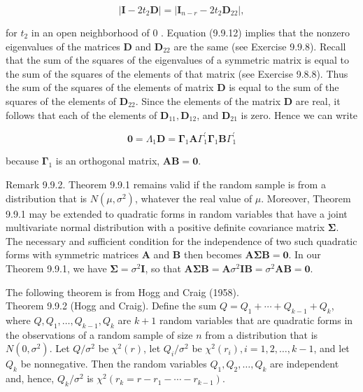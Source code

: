 \begin{equation*}
\left|\mathbf{I}-2 t_{2} \mathbf{D}\right|=\left|\mathbf{I}_{n-r}-2 t_{2} \mathbf{D}_{22}\right|, \tag{9.9.12}
\end{equation*}


for $t_{2}$ in an open neighborhood of 0 . Equation (9.9.12) implies that the nonzero eigenvalues of the matrices $\mathbf{D}$ and $\mathbf{D}_{22}$ are the same (see Exercise 9.9.8). Recall that the sum of the squares of the eigenvalues of a symmetric matrix is equal to the sum of the squares of the elements of that matrix (see Exercise 9.8.8). Thus the sum of the squares of the elements of matrix $\mathbf{D}$ is equal to the sum of the squares of the elements of $\mathbf{D}_{22}$. Since the elements of the matrix $\mathbf{D}$ are real, it follows that each of the elements of $\mathbf{D}_{11}, \mathbf{D}_{12}$, and $\mathbf{D}_{21}$ is zero. Hence we can write

$$
\mathbf{0}=\Lambda_{1} \mathbf{D}=\boldsymbol{\Gamma}_{1} \mathbf{A} \Gamma_{1}^{\prime} \boldsymbol{\Gamma}_{1} \mathbf{B} \Gamma_{1}^{\prime}
$$

because $\boldsymbol{\Gamma}_{1}$ is an orthogonal matrix, $\mathbf{A B}=\mathbf{0}$.

Remark 9.9.2. Theorem 9.9.1 remains valid if the random sample is from a distribution that is $N\left(\mu, \sigma^{2}\right)$, whatever the real value of $\mu$. Moreover, Theorem 9.9.1 may be extended to quadratic forms in random variables that have a joint multivariate normal distribution with a positive definite covariance matrix $\boldsymbol{\Sigma}$. The necessary and sufficient condition for the independence of two such quadratic forms with symmetric matrices $\boldsymbol{A}$ and $\boldsymbol{B}$ then becomes $\boldsymbol{A} \boldsymbol{\Sigma} \boldsymbol{B}=\mathbf{0}$. In our Theorem 9.9.1, we have $\boldsymbol{\Sigma}=\sigma^{2} \boldsymbol{I}$, so that $\boldsymbol{A} \boldsymbol{\Sigma} \boldsymbol{B}=\boldsymbol{A} \sigma^{2} \boldsymbol{I} \boldsymbol{B}=\sigma^{2} \boldsymbol{A} \boldsymbol{B}=\mathbf{0}$.

The following theorem is from Hogg and Craig (1958).\\
Theorem 9.9.2 (Hogg and Craig). Define the sum $Q=Q_{1}+\cdots+Q_{k-1}+Q_{k}$, where $Q, Q_{1}, \ldots, Q_{k-1}, Q_{k}$ are $k+1$ random variables that are quadratic forms in the observations of a random sample of size $n$ from a distribution that is $N\left(0, \sigma^{2}\right)$. Let $Q / \sigma^{2}$ be $\chi^{2}(r)$, let $Q_{i} / \sigma^{2}$ be $\chi^{2}\left(r_{i}\right), i=1,2, \ldots, k-1$, and let $Q_{k}$ be nonnegative. Then the random variables $Q_{1}, Q_{2}, \ldots, Q_{k}$ are independent and, hence, $Q_{k} / \sigma^{2}$ is $\chi^{2}\left(r_{k}=r-r_{1}-\cdots-r_{k-1}\right)$.

